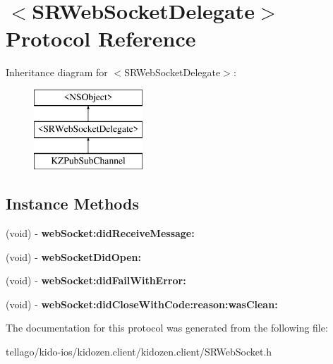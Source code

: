 \hypertarget{protocol_s_r_web_socket_delegate-p}{\section{$<$S\-R\-Web\-Socket\-Delegate$>$ Protocol Reference}
\label{protocol_s_r_web_socket_delegate-p}
}
Inheritance diagram for $<$S\-R\-Web\-Socket\-Delegate$>$\-:\begin{figure}[H]
\begin{center}
\leavevmode
\includegraphics[height=3.000000cm]{protocol_s_r_web_socket_delegate-p}
\end{center}
\end{figure}
\subsection*{Instance Methods}
\begin{DoxyCompactItemize}
\item 
\hypertarget{protocol_s_r_web_socket_delegate-p_ab3ec1bc43d718986e8eef06fed07d4c7}{(void) -\/ {\bfseries web\-Socket\-:did\-Receive\-Message\-:}}\label{protocol_s_r_web_socket_delegate-p_ab3ec1bc43d718986e8eef06fed07d4c7}

\item 
\hypertarget{protocol_s_r_web_socket_delegate-p_af2b8d068c9a7b7dd93089f49ca509595}{(void) -\/ {\bfseries web\-Socket\-Did\-Open\-:}}\label{protocol_s_r_web_socket_delegate-p_af2b8d068c9a7b7dd93089f49ca509595}

\item 
\hypertarget{protocol_s_r_web_socket_delegate-p_a496d182ec922cfaa7d595376c6224a62}{(void) -\/ {\bfseries web\-Socket\-:did\-Fail\-With\-Error\-:}}\label{protocol_s_r_web_socket_delegate-p_a496d182ec922cfaa7d595376c6224a62}

\item 
\hypertarget{protocol_s_r_web_socket_delegate-p_ab4dbe848fef8703735fd0f52dcd7c958}{(void) -\/ {\bfseries web\-Socket\-:did\-Close\-With\-Code\-:reason\-:was\-Clean\-:}}\label{protocol_s_r_web_socket_delegate-p_ab4dbe848fef8703735fd0f52dcd7c958}

\end{DoxyCompactItemize}


The documentation for this protocol was generated from the following file\-:\begin{DoxyCompactItemize}
\item 
tellago/kido-\/ios/kidozen.\-client/kidozen.\-client/S\-R\-Web\-Socket.\-h\end{DoxyCompactItemize}

